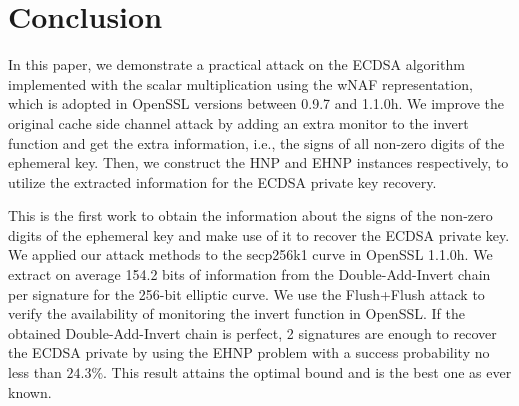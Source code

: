 \section{Conclusion}
\label{sec:conclusion}
In this paper, we demonstrate a practical attack on the ECDSA algorithm implemented  with the scalar multiplication using the wNAF representation, which is adopted in OpenSSL versions between 0.9.7 and 1.1.0h.
We improve the original cache side channel attack
 by adding an extra monitor to the invert function and get the extra information, i.e., the signs of all non-zero digits of the ephemeral key.
Then, we construct the HNP and EHNP instances respectively,  to utilize the extracted information for the ECDSA private key recovery.


This is the first work to obtain the information about the signs of the non-zero digits of the ephemeral key and make use of it to recover the ECDSA private key.
We applied our attack methods to the secp256k1 curve in OpenSSL 1.1.0h.
We extract on average 154.2 bits of information from the Double-Add-Invert chain per signature for the 256-bit elliptic curve. We use the Flush+Flush attack to verify the availability of monitoring the invert function in OpenSSL.
If the obtained Double-Add-Invert chain is perfect,
2 signatures are enough to recover the ECDSA private by using the EHNP problem with a success probability no less than $24.3\%$.
This result attains the optimal bound and is the best one as ever known.






